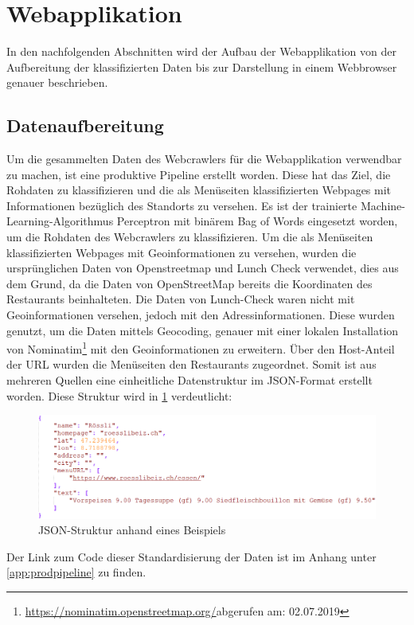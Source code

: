 \section{Webapplikation}
In den nachfolgenden Abschnitten wird der Aufbau der Webapplikation von der Aufbereitung der klassifizierten Daten bis zur Darstellung in einem Webbrowser genauer beschrieben.
\subsection{Datenaufbereitung}
Um die gesammelten Daten des Webcrawlers für die Webapplikation verwendbar zu machen, ist eine produktive Pipeline erstellt worden.
Diese hat das Ziel, die Rohdaten zu klassifizieren und die als Menüseiten klassifizierten Webpages mit Informationen bezüglich des Standorts zu versehen.
Es ist der trainierte Machine-Learning-Algorithmus \glqq Perceptron mit binärem Bag of Words\grqq{} eingesetzt worden, um die Rohdaten des Webcrawlers zu klassifizieren.
Um die als Menüseiten klassifizierten Webpages mit Geoinformationen zu versehen, wurden die ursprünglichen Daten von Openstreetmap und Lunch Check verwendet, dies aus dem Grund, da die Daten von OpenStreetMap bereits die Koordinaten des Restaurants beinhalteten.
Die Daten von Lunch-Check waren nicht mit Geoinformationen versehen, jedoch mit den Adressinformationen.
Diese wurden genutzt, um  die Daten mittels Geocoding, genauer mit einer lokalen Installation von Nominatim\footnote{\url{https://nominatim.openstreetmap.org/}abgerufen am: 02.07.2019} mit den Geoinformationen zu erweitern.
Über den Host-Anteil der URL wurden die Menüseiten den Restaurants zugeordnet.
Somit ist aus mehreren Quellen eine einheitliche Datenstruktur im JSON-Format erstellt worden.
Diese Struktur wird in \cref{fig:json_struktur} verdeutlicht:
\begin{figure}[H]	
	\includegraphics[width=1\columnwidth,keepaspectratio]{img/json_struktur.png}
	\caption{JSON-Struktur anhand eines Beispiels}
	\label{fig:json_struktur}
\end{figure}
Der Link zum Code dieser Standardisierung der Daten ist im Anhang unter \cref{app:prodpipeline} zu finden.

